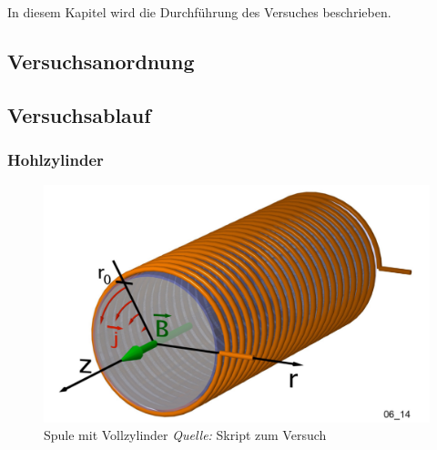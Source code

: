In diesem Kapitel wird die Durchf\"uhrung des Versuches beschrieben.


\subsection{Versuchsanordnung}
\label{sec:durchf:subsec:anordn}



\subsection{Versuchsablauf}
\label{sec:durchf:subsec:ablauf}


\subsubsection{Hohlzylinder}

\begin{figure}[th!]
    \centering
    \includegraphics[width=.5\textwidth]{images/spule-vollzylinder.png}
    \caption{Spule mit Vollzylinder \emph{Quelle:} Skript zum Versuch}
\end{figure}


